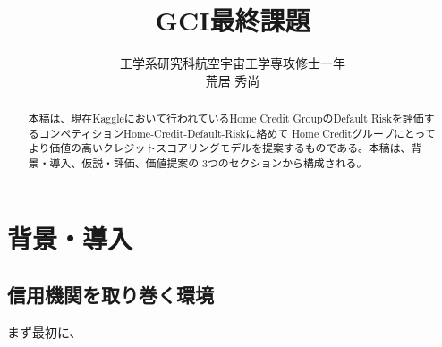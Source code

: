 \documentclass[a4paper,10pt]{jsarticle}
\title{GCI最終課題}
\author{工学系研究科航空宇宙工学専攻修士一年\\荒居 秀尚}
\begin{document}
\maketitle

\begin{abstract}
本稿は、現在Kaggleにおいて行われているHome Credit GroupのDefault Riskを評価するコンペティションHome-Credit-Default-Riskに絡めて
Home Creditグループにとってより価値の高いクレジットスコアリングモデルを提案するものである。本稿は、背景・導入、仮説・評価、価値提案の
3つのセクションから構成される。
\end{abstract}

\section{背景・導入}
\subsection{信用機関を取り巻く環境}
まず最初に、
\end{document}
